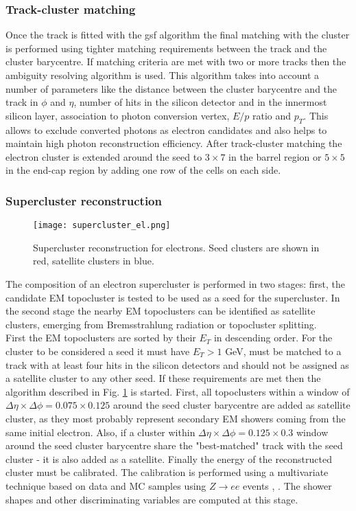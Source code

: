  	\subsubsection{Track-cluster matching}
 	Once the track is fitted with the \gls{gsf} algorithm the final matching with the cluster is performed using tighter matching requirements between the track and the cluster barycentre. If matching criteria are met with two or more tracks then the ambiguity resolving algorithm is used. This algorithm takes into account a number of parameters like the distance between the cluster barycentre and the track in $\phi$ and $\eta$, number of hits in the silicon detector and in the innermost silicon layer, association to photon conversion vertex, $E/p$ ratio and $p_T$. This allows to exclude converted photons as electron candidates and also helps to maintain high photon reconstruction efficiency. After track-cluster matching the electron cluster is extended around the seed to $3 \times 7$ in the barrel region or $5\times 5$ in the end-cap region by adding one row of the cells on each side. \\
 	\subsubsection{Supercluster reconstruction}
 	\begin{figure}[htbp]
 		\centering
 		\texttt{[image: supercluster\_el.png]}
 		\caption[Supercluster]{Supercluster reconstruction for electrons. Seed clusters are shown in red, satellite clusters in blue.}
 		\label{fig::supercluster}
 	\end{figure}
 	The composition of an electron supercluster is performed in two stages: first, the candidate EM topocluster is tested to be used as a seed for the supercluster. In the second stage the nearby EM topoclusters can be identified as satellite clusters, emerging from Bremsstrahlung radiation or topocluster splitting.\\
 	First the EM topoclusters are sorted by their $E_T$ in descending order. For the cluster to be considered a seed it must have $E_T>1$ GeV, must be matched to a track with at least four hits in the silicon detectors and should not be assigned as a satellite cluster to any other seed. If these requirements are met then the algorithm described in Fig. \ref{fig::supercluster} is started. First, all topoclusters within a window of  $\Delta \eta \times \Delta \phi = 0.075 \times 0.125$ around the seed cluster barycentre are added as satellite cluster, as they most probably represent secondary EM showers coming from the same initial electron. Also, if a cluster within $\Delta \eta \times \Delta \phi = 0.125 \times 0.3$ window around the seed cluster barycentre share the "best-matched" track with the seed cluster - it is also added as a satellite.
  	Finally the energy of the reconstructed cluster must be calibrated. The calibration is performed using a multivariate technique based on data and MC samples using $Z \rightarrow ee$ events \cite{Aaboud:2018ugz}, \cite {Aaboud:2018yqu}. The shower shapes and other discriminating variables are computed at this stage.
